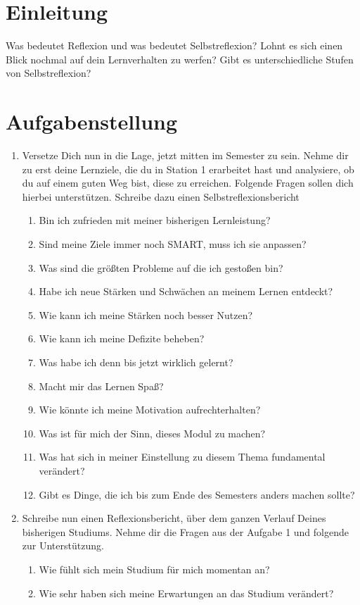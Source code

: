 \documentclass[a4paper,oneside]{scrarticle}
\begin{document}
	\section*{Einleitung}
	Was bedeutet Reflexion und was bedeutet Selbstreflexion? Lohnt es sich einen Blick nochmal auf dein Lernverhalten zu werfen? Gibt es unterschiedliche Stufen von Selbstreflexion?
	
	\section*{Aufgabenstellung}

	\begin{enumerate}
		\item Versetze Dich nun in die Lage, jetzt mitten im Semester zu sein. Nehme dir zu erst deine Lernziele, die du in Station 1 erarbeitet hast und analysiere, ob du auf einem guten Weg bist, diese zu erreichen. Folgende Fragen sollen dich hierbei unterstützen. Schreibe dazu einen Selbstreflexionsbericht 
		\begin{enumerate}
			\item Bin ich zufrieden mit meiner bisherigen Lernleistung?
			\item Sind meine Ziele immer noch SMART, muss ich sie anpassen?
			\item Was sind die größten Probleme auf die ich gestoßen bin?
			\item Habe ich neue Stärken und Schwächen an meinem Lernen entdeckt?
			\item Wie kann ich meine Stärken noch besser Nutzen?
			\item Wie kann ich meine Defizite beheben?
			\item Was habe ich denn bis jetzt wirklich gelernt?
			\item Macht mir das Lernen Spaß?
			\item Wie könnte ich meine Motivation aufrechterhalten?
			\item Was ist für mich der Sinn, dieses Modul zu machen?
			\item Was hat sich in meiner Einstellung zu diesem Thema fundamental verändert?
			\item Gibt es Dinge, die ich bis zum Ende des Semesters anders machen sollte?
		\end{enumerate}
		\item Schreibe nun einen Reflexionsbericht, über dem ganzen Verlauf Deines bisherigen Studiums. Nehme dir die Fragen aus der Aufgabe 1 und folgende zur Unterstützung.
		\begin{enumerate}
			\item Wie fühlt sich mein Studium für mich momentan an?
			\item Wie sehr haben sich meine Erwartungen an das Studium verändert?
		\end{enumerate}

	\end{enumerate}
\end{document}
